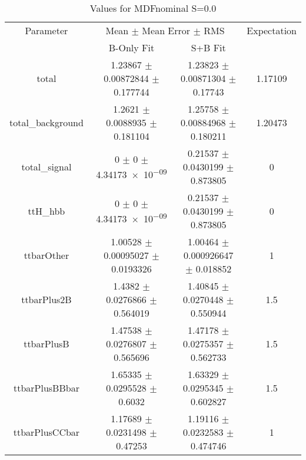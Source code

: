 \begin{table}
\centering
\caption{Values for MDFnominal S=0.0}
\begin{tabular}{cccc}
\toprule
Parameter & \multicolumn{2}{c}{Mean $\pm$ Mean Error $\pm$ RMS} & Expectation\\
 & B-Only Fit & S+B Fit & \\
\midrule
total & \num{1.23867} $\pm$ \num{0.00872844} $\pm$ \num{0.177744} & \num{1.23823} $\pm$ \num{0.00871304} $\pm$ \num{0.17743} & \num{1.17109}\\
total\_background & \num{1.2621} $\pm$ \num{0.0088935} $\pm$ \num{0.181104} & \num{1.25758} $\pm$ \num{0.00884968} $\pm$ \num{0.180211} & \num{1.20473}\\
total\_signal & \num{0} $\pm$ \num{0} $\pm$ \num{4.34173e-09} & \num{0.21537} $\pm$ \num{0.0430199} $\pm$ \num{0.873805} & \num{0}\\
ttH\_hbb & \num{0} $\pm$ \num{0} $\pm$ \num{4.34173e-09} & \num{0.21537} $\pm$ \num{0.0430199} $\pm$ \num{0.873805} & \num{0}\\
ttbarOther & \num{1.00528} $\pm$ \num{0.00095027} $\pm$ \num{0.0193326} & \num{1.00464} $\pm$ \num{0.000926647} $\pm$ \num{0.018852} & \num{1}\\
ttbarPlus2B & \num{1.4382} $\pm$ \num{0.0276866} $\pm$ \num{0.564019} & \num{1.40845} $\pm$ \num{0.0270448} $\pm$ \num{0.550944} & \num{1.5}\\
ttbarPlusB & \num{1.47538} $\pm$ \num{0.0276807} $\pm$ \num{0.565696} & \num{1.47178} $\pm$ \num{0.0275357} $\pm$ \num{0.562733} & \num{1.5}\\
ttbarPlusBBbar & \num{1.65335} $\pm$ \num{0.0295528} $\pm$ \num{0.6032} & \num{1.63329} $\pm$ \num{0.0295345} $\pm$ \num{0.602827} & \num{1.5}\\
ttbarPlusCCbar & \num{1.17689} $\pm$ \num{0.0231498} $\pm$ \num{0.47253} & \num{1.19116} $\pm$ \num{0.0232583} $\pm$ \num{0.474746} & \num{1}\\
\bottomrule
\end{tabular}
\end{table}